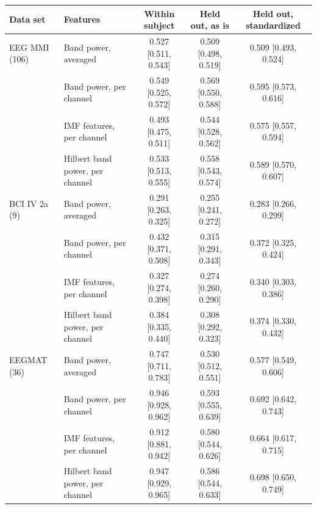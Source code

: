 \begin{tabular}{@{}llccc@{}}
\toprule
Data set & Features & Within subject & Held out, as is & Held out, standardized \\
\midrule
EEG MMI (106) & Band power, averaged & 0.527 [0.511, 0.543] & 0.509 [0.498, 0.519] & 0.509 [0.493, 0.524] \\
 & Band power, per channel & 0.549 [0.525, 0.572] & 0.569 [0.550, 0.588] & 0.595 [0.573, 0.616] \\
 & IMF features, per channel & 0.493 [0.475, 0.511] & 0.544 [0.528, 0.562] & 0.575 [0.557, 0.594] \\
 & Hilbert band power, per channel & 0.533 [0.513, 0.555] & 0.558 [0.543, 0.574] & 0.589 [0.570, 0.607] \\
\midrule
BCI IV 2a (9) & Band power, averaged & 0.291 [0.263, 0.325] & 0.255 [0.241, 0.272] & 0.283 [0.266, 0.299] \\
 & Band power, per channel & 0.432 [0.371, 0.508] & 0.315 [0.291, 0.343] & 0.372 [0.325, 0.424] \\
 & IMF features, per channel & 0.327 [0.274, 0.398] & 0.274 [0.260, 0.290] & 0.340 [0.303, 0.386] \\
 & Hilbert band power, per channel & 0.384 [0.335, 0.440] & 0.308 [0.292, 0.323] & 0.374 [0.330, 0.432] \\
\midrule
EEGMAT (36) & Band power, averaged & 0.747 [0.711, 0.783] & 0.530 [0.512, 0.551] & 0.577 [0.549, 0.606] \\
 & Band power, per channel & 0.946 [0.928, 0.962] & 0.593 [0.555, 0.639] & 0.692 [0.642, 0.743] \\
 & IMF features, per channel & 0.912 [0.881, 0.942] & 0.580 [0.544, 0.626] & 0.664 [0.617, 0.715] \\
 & Hilbert band power, per channel & 0.947 [0.929, 0.965] & 0.586 [0.544, 0.633] & 0.698 [0.650, 0.749] \\
\bottomrule
\end{tabular}

